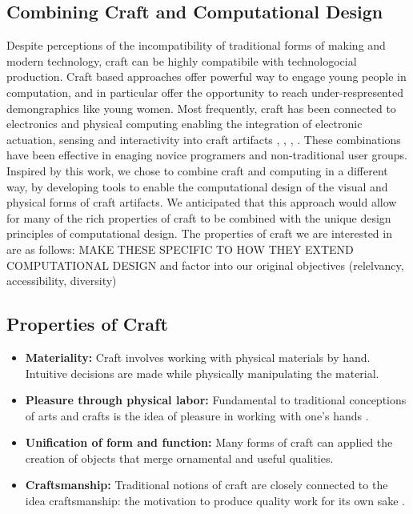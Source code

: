 \documentclass{sigchi}
\begin{document}
\subsection{Combining Craft and Computational Design}
Despite perceptions of the incompatibility of traditional forms of making and modern technology, craft can be highly compatibile with technologocial production. Craft based approaches offer powerful way to engage young people in computation, and in particular offer the opportunity to reach under-respresented demongraphics like young women. Most frequently, craft has been connected to electronics and physical computing enabling the integration of electronic actuation, sensing and interactivity into craft artifacts \cite{dave}, \cite{kit_of_no_parts}, \cite{jie}, \cite{leah_lilypad}. These combinations have been effective in enaging novice programers and non-traditional user groups. Inspired by this work, we chose to combine craft and computing in a different way, by developing tools to enable the computational design of the visual and physical forms of craft artifacts. We anticipated that this approach would allow for many of the rich properties of craft to be combined with the unique design principles of computational design. The properties of craft we are interested in are as follows:
MAKE THESE SPECIFIC TO HOW THEY EXTEND COMPUTATIONAL DESIGN and factor into our original objectives (relelvancy, accessibility, diversity)
\subsection{Properties of Craft}
\begin{itemize}
\item \textbf{Materiality:} Craft involves working with physical materials by hand. Intuitive decisions are made while physically manipulating the material. 
\vspace{-6pt}
\item \textbf{Pleasure through physical labor:} Fundamental to traditional conceptions of arts and crafts is the idea of pleasure in working with one's hands \cite{abstracting_craft}.
\vspace{-6pt}
\item \textbf{Unification of form and function:} Many forms of craft can applied the creation of objects that merge ornamental and useful qualities.
\vspace{-6pt}
\item \textbf{Craftsmanship:} Traditional notions of craft are closely connected to the idea craftsmanship: the motivation to produce quality work for its own sake \cite{the_craftsman}.
\end{itemize}
\end{document}
